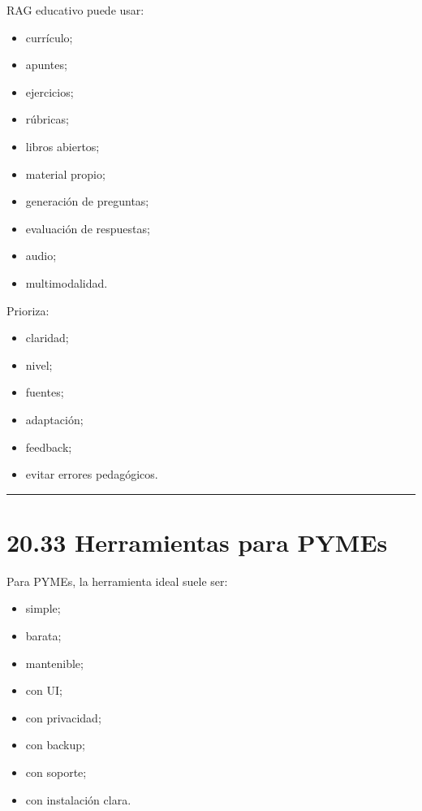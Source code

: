 RAG educativo puede usar:

\begin{itemize}
\tightlist
\item
  currículo;
\item
  apuntes;
\item
  ejercicios;
\item
  rúbricas;
\item
  libros abiertos;
\item
  material propio;
\item
  generación de preguntas;
\item
  evaluación de respuestas;
\item
  audio;
\item
  multimodalidad.
\end{itemize}

Prioriza:

\begin{itemize}
\tightlist
\item
  claridad;
\item
  nivel;
\item
  fuentes;
\item
  adaptación;
\item
  feedback;
\item
  evitar errores pedagógicos.
\end{itemize}

\begin{center}\rule{0.5\linewidth}{0.5pt}\end{center}

\section{20.33 Herramientas para PYMEs}\label{herramientas-para-pymes}

Para PYMEs, la herramienta ideal suele ser:

\begin{itemize}
\tightlist
\item
  simple;
\item
  barata;
\item
  mantenible;
\item
  con UI;
\item
  con privacidad;
\item
  con backup;
\item
  con soporte;
\item
  con instalación clara.
\end{itemize}

